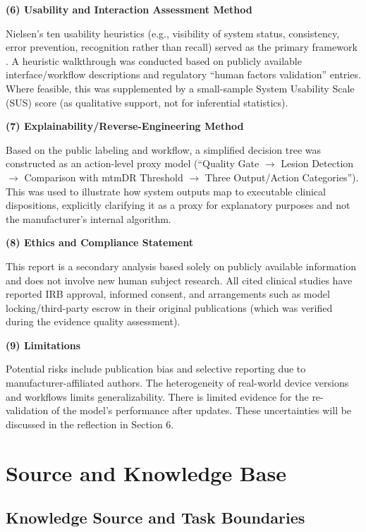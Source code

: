 \documentclass[sigplan,screen]{acmart}
\begin{document}
\textbf{(6) Usability and Interaction Assessment Method}

Nielsen's ten usability heuristics (e.g., visibility of system status, consistency, error prevention, recognition rather than recall) served as the primary framework \cite{nielsen2020usability}. A heuristic walkthrough was conducted based on publicly available interface/workflow descriptions and regulatory ``human factors validation'' entries. Where feasible, this was supplemented by a small-sample System Usability Scale (SUS) score (as qualitative support, not for inferential statistics).

\textbf{(7) Explainability/Reverse-Engineering Method}

Based on the public labeling and workflow, a simplified decision tree was constructed as an action-level proxy model (``Quality Gate $\rightarrow$ Lesion Detection $\rightarrow$ Comparison with mtmDR Threshold $\rightarrow$ Three Output/Action Categories''). This was used to illustrate how system outputs map to executable clinical dispositions, explicitly clarifying it as a proxy for explanatory purposes and not the manufacturer's internal algorithm.

\textbf{(8) Ethics and Compliance Statement}

This report is a secondary analysis based solely on publicly available information and does not involve new human subject research. All cited clinical studies have reported IRB approval, informed consent, and arrangements such as model locking/third-party escrow in their original publications (which was verified during the evidence quality assessment).

\textbf{(9) Limitations}

Potential risks include publication bias and selective reporting due to manufacturer-affiliated authors. The heterogeneity of real-world device versions and workflows limits generalizability. There is limited evidence for the re-validation of the model's performance after updates. These uncertainties will be discussed in the reflection in Section 6.

\section{Source and Knowledge Base}

\subsection{Knowledge Source and Task Boundaries}
\end{document}
